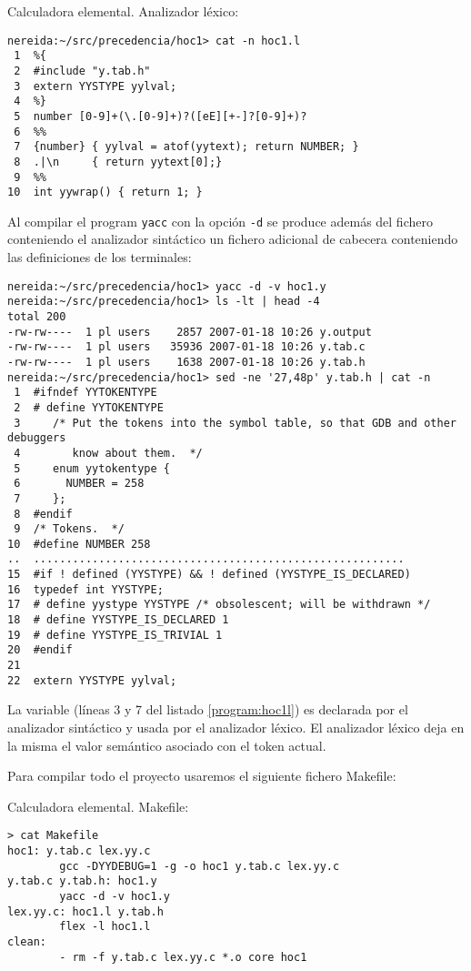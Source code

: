 
\begin{program} 
\label{program:hoc1l}
Calculadora elemental.  Analizador léxico:
\begin{verbatim}
nereida:~/src/precedencia/hoc1> cat -n hoc1.l
 1  %{
 2  #include "y.tab.h"
 3  extern YYSTYPE yylval;
 4  %}
 5  number [0-9]+(\.[0-9]+)?([eE][+-]?[0-9]+)?
 6  %%
 7  {number} { yylval = atof(yytext); return NUMBER; }
 8  .|\n     { return yytext[0];}
 9  %%
10  int yywrap() { return 1; }
\end{verbatim}
\end{program}


Al compilar el program \verb|yacc| con la opción \verb|-d|
se produce además del fichero  conteniendo el
analizador sintáctico un fichero adicional de cabecera 
conteniendo
las definiciones de los terminales:
\begin{verbatim}
nereida:~/src/precedencia/hoc1> yacc -d -v hoc1.y
nereida:~/src/precedencia/hoc1> ls -lt | head -4
total 200
-rw-rw----  1 pl users    2857 2007-01-18 10:26 y.output
-rw-rw----  1 pl users   35936 2007-01-18 10:26 y.tab.c
-rw-rw----  1 pl users    1638 2007-01-18 10:26 y.tab.h
nereida:~/src/precedencia/hoc1> sed -ne '27,48p' y.tab.h | cat -n
 1  #ifndef YYTOKENTYPE
 2  # define YYTOKENTYPE
 3     /* Put the tokens into the symbol table, so that GDB and other debuggers
 4        know about them.  */
 5     enum yytokentype {
 6       NUMBER = 258
 7     };
 8  #endif
 9  /* Tokens.  */
10  #define NUMBER 258
..  .........................................................
15  #if ! defined (YYSTYPE) && ! defined (YYSTYPE_IS_DECLARED)
16  typedef int YYSTYPE;
17  # define yystype YYSTYPE /* obsolescent; will be withdrawn */
18  # define YYSTYPE_IS_DECLARED 1
19  # define YYSTYPE_IS_TRIVIAL 1
20  #endif
21
22  extern YYSTYPE yylval;
\end{verbatim}
La variable  (líneas 3 y 7 del listado \ref{program:hoc1l}) 
es declarada por el
analizador sintáctico y usada por el analizador 
léxico. El analizador léxico deja en la misma el valor semántico
asociado con el token actual.


Para compilar todo el proyecto usaremos el siguiente
fichero Makefile:
\begin{program} Calculadora elemental.  Makefile:
\begin{verbatim}
> cat Makefile
hoc1: y.tab.c lex.yy.c
        gcc -DYYDEBUG=1 -g -o hoc1 y.tab.c lex.yy.c
y.tab.c y.tab.h: hoc1.y
        yacc -d -v hoc1.y
lex.yy.c: hoc1.l y.tab.h
        flex -l hoc1.l
clean:
        - rm -f y.tab.c lex.yy.c *.o core hoc1
\end{verbatim}
\end{program}


